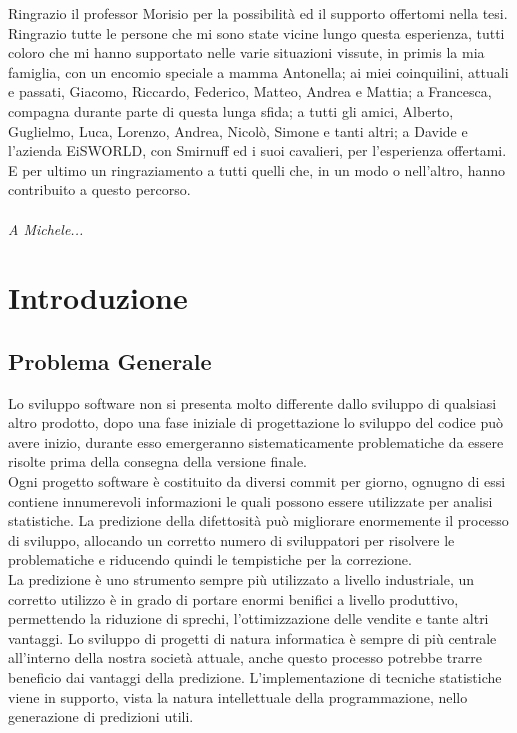 \documentclass[%
    corpo=12pt,
    twoside,
    oldstyle,
    autoretitolo,
    greek,
    evenboxes,
]{toptesi}
\begin{document}
\acknowledgements
Ringrazio il professor Morisio per la possibilità ed il supporto offertomi nella tesi.\\
Ringrazio tutte le persone che mi sono state vicine lungo questa esperienza, tutti coloro che mi hanno supportato nelle varie situazioni vissute, in primis la mia famiglia, con un encomio speciale a mamma Antonella; ai miei coinquilini, attuali e passati, Giacomo, Riccardo, Federico, Matteo, Andrea e Mattia; a Francesca, compagna durante parte di questa lunga sfida; a tutti gli amici, Alberto, Guglielmo, Luca, Lorenzo, Andrea, Nicolò, Simone e tanti altri; a Davide e l'azienda EiSWORLD, con Smirnuff ed i suoi cavalieri, per l'esperienza offertami. E per ultimo un ringraziamento a tutti quelli che, in un modo o nell'altro, hanno contribuito a questo percorso.\\\\
\textit{A Michele...}

\renewcommand{\baselinestretch}{1.1}\normalsize
\indici
\renewcommand{\baselinestretch}{1.5}\normalsize

\mainmatter


\chapter{Introduzione}
\label{chap:intro}
\section{Problema Generale}
Lo sviluppo software non si presenta molto differente dallo sviluppo di qualsiasi altro prodotto, dopo una fase iniziale di progettazione lo sviluppo del codice può avere inizio, durante esso emergeranno sistematicamente problematiche da essere risolte prima della consegna della versione finale.\\
Ogni progetto software è costituito da diversi commit per giorno, ognugno di essi contiene innumerevoli informazioni le quali possono essere utilizzate per analisi statistiche. La predizione della difettosità può migliorare enormemente il processo di sviluppo, allocando un corretto numero di sviluppatori per risolvere le problematiche e riducendo quindi le tempistiche per la correzione.\\
La predizione è uno strumento sempre più utilizzato a livello industriale, un corretto utilizzo è in grado di portare enormi benifici a livello produttivo, permettendo la riduzione di sprechi, l'ottimizzazione delle vendite e tante altri vantaggi. Lo sviluppo di progetti di natura informatica è sempre di più centrale all'interno della nostra società attuale, anche questo processo potrebbe trarre beneficio dai vantaggi della predizione. L'implementazione di tecniche statistiche viene in supporto, vista la natura intellettuale della programmazione, nello generazione di predizioni utili.
\end{document}
